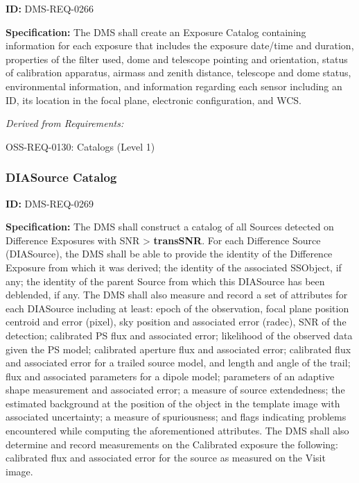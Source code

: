 \documentclass[SE,toc,lsstdraft]{lsstdoc}
\begin{document}
\label{DMS-REQ-0266}
\textbf{ID:} DMS-REQ-0266

\textbf{Specification:} The DMS shall create an Exposure Catalog containing information for each exposure that includes the exposure date/time and duration, properties of the filter used, dome and telescope pointing and orientation, status of calibration apparatus, airmass and zenith distance, telescope and dome status, environmental information, and information regarding each sensor including an ID, its location in the focal plane, electronic configuration, and WCS.






\emph{Derived from Requirements:}

OSS-REQ-0130:
Catalogs (Level 1) \newline


\subsubsection{DIASource Catalog}

\label{DMS-REQ-0269}
\textbf{ID:} DMS-REQ-0269

\textbf{Specification:} The DMS shall construct a catalog of all Sources detected on Difference Exposures with SNR > \textbf{transSNR}. For each Difference Source (DIASource), the DMS shall be able to provide the identity of the Difference Exposure from which it was derived; the identity of the associated SSObject, if any; the identity of the parent Source from which this DIASource has been deblended, if any. The DMS shall also measure and record a set of attributes for each DIASource including at least: epoch of the observation, focal plane position centroid and error (pixel), sky position and associated error (radec), SNR of the detection; calibrated PS flux and associated error; likelihood of the observed data given the PS model; calibrated aperture flux and associated error; calibrated flux and associated error for a trailed source model, and length and angle of the trail; flux and associated parameters for a dipole model; parameters of an adaptive shape measurement and associated error; a measure of source extendedness; the estimated background at the position of the object in the template image with associated uncertainty; a measure of spuriousness; and flags indicating problems encountered while computing the aforementioned attributes. The DMS shall also determine and record measurements on the Calibrated exposure the following: calibrated flux and associated error for the source as measured on the Visit image.
\end{document}
